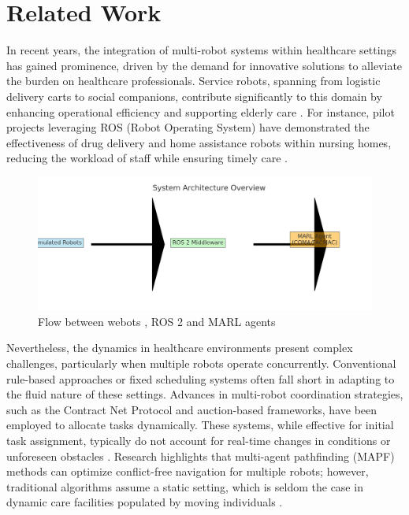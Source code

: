 \documentclass[conference]{IEEEtran}
\begin{document}
\section{Related Work}
\label{sec:related}
In recent years, the integration of multi-robot systems within healthcare settings has gained prominence, driven by the demand for innovative solutions to alleviate the burden on healthcare professionals. Service robots, spanning from logistic delivery carts to social companions, contribute significantly to this domain by enhancing operational efficiency and supporting elderly care \citep{bonaccosi2016}. For instance, pilot projects leveraging ROS (Robot Operating System) have demonstrated the effectiveness of drug delivery and home assistance robots within nursing homes, reducing the workload of staff while ensuring timely care \citep{salinas2023}.
\begin{figure}
    \centering
    \includegraphics[width=1\linewidth]{architecture_overview.png}
    \caption{Flow between webots , ROS 2 and MARL agents }
    \label{fig:placeholder2}
\end{figure}
Nevertheless, the dynamics in healthcare environments present complex challenges, particularly when multiple robots operate concurrently. Conventional rule-based approaches or fixed scheduling systems often fall short in adapting to the fluid nature of these settings. Advances in multi-robot coordination strategies, such as the Contract Net Protocol and auction-based frameworks, have been employed to allocate tasks dynamically. These systems, while effective for initial task assignment, typically do not account for real-time changes in conditions or unforeseen obstacles \citep{kayy2017, salinas2023}. Research highlights that multi-agent pathfinding (MAPF) methods can optimize conflict-free navigation for multiple robots; however, traditional algorithms assume a static setting, which is seldom the case in dynamic care facilities populated by moving individuals \citep{sharon2015}.
\end{document}
